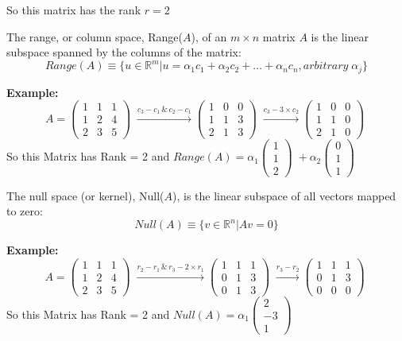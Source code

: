 \documentclass{article}
\begin{document}
				 So this matrix has the rank $r = 2$

\begin{tcolorbox}[colback=seashell,colframe=beaublue,title=Range]	
The range, or column space, Range($A$), of an $m \times n$ matrix $A$ is the linear
subspace spanned by the columns of the matrix:
			 $$ Range(A) \equiv \{u \in \mathbb{R}^{m} | u = \alpha_1 c_1 + \alpha_2 c_2 + \hdots + \alpha_n c_n , arbitrary \; \alpha_j \} $$
		 
\end{tcolorbox}
 \textbf{Example: } 
		 $$
			A = \begin{pmatrix} 1 & 1 & 1 \\ 1 & 2 & 4 \\ 2 & 3 & 5 \end{pmatrix} \; 
				\xrightarrow{c_3 - c_1 \, \& \, c_2 - c_1}
			 \begin{pmatrix} 1 & 0 & 0 \\ 1 & 1 & 3 \\ 2 & 1 & 3 \end{pmatrix} \; 
				 \xrightarrow{c_3 - 3\times c_2}
	         \begin{pmatrix} 1 & 0 & 0 \\ 1 & 1 & 0 \\ 2 & 1 & 0 \end{pmatrix} \; $$		
				 So this Matrix has Rank = 2 and $ Range (A) = \alpha_1 \begin{pmatrix} 1\\ 1 \\ 2 \end{pmatrix} \; +   \alpha_2 \begin{pmatrix} 0\\ 1 \\ 1 \end{pmatrix} \; $
\begin{tcolorbox}[colback=seashell,colframe=beaublue,title=Null Space]	

The null space (or kernel), Null($A$), is the linear subspace of all vectors mapped to zero:
			 $$ Null(A) \equiv \{v \in \mathbb{R}^{n} | Av = 0 \} $$
\end{tcolorbox}
		  \textbf{Example:} 
			 $$
			A =  \begin{pmatrix} 1 & 1 & 1 \\ 1 & 2 & 4 \\ 2 & 3 & 5 \end{pmatrix} \; 
				\xrightarrow{r_2 - r_1 \, \& \, r_3-2\times r_1}
			 \begin{pmatrix} 1 & 1 & 1 \\ 0 & 1 & 3 \\ 0 & 1 & 3 \end{pmatrix} \; 
				 \xrightarrow{r_3 - r_2}
		         \begin{pmatrix} 1 & 1 & 1 \\ 0 & 1 & 3 \\ 0 & 0 & 0 \end{pmatrix} \; $$
				 So this Matrix has Rank = 2 and $ Null(A) = \alpha_1 \begin{pmatrix} 2\\ -3 \\ 1 \end{pmatrix} \; $
\end{document}
